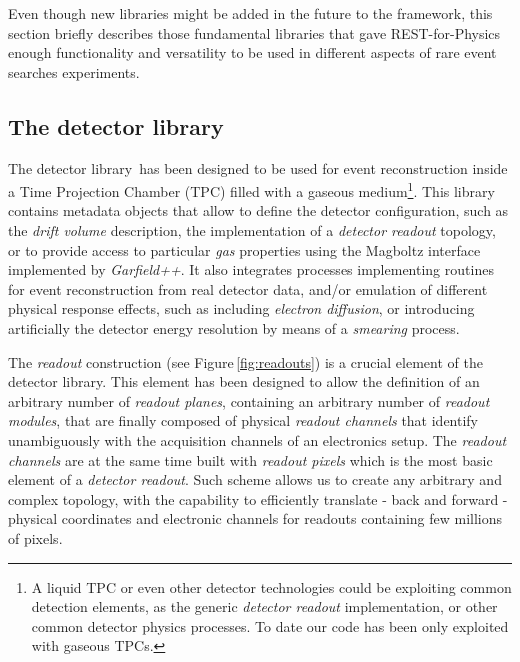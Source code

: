 Even though new libraries might be added in the future to the framework, this section briefly describes those fundamental libraries that gave REST-for-Physics enough functionality and versatility to be used in different aspects of rare event searches experiments.

\subsection{The detector library}

The detector library\,\cite{REST_Detector_Git} has been designed to be used for event reconstruction inside a Time Projection Chamber (TPC) filled with a gaseous medium\footnote{A liquid TPC or even other detector technologies could be exploiting common detection elements, as the generic \emph{detector readout} implementation, or other common detector physics processes. To date our code has been only exploited with gaseous TPCs.}. This library contains metadata objects that allow to define the detector configuration, such as the \emph{drift volume} description, the implementation of a \emph{detector readout} topology, or to provide access to particular \emph{gas} properties using the Magboltz interface implemented by \emph{Garfield++}. It also integrates processes implementing routines for event reconstruction from real detector data, and/or emulation of different physical response effects, such as including \emph{electron diffusion}, or introducing artificially the detector energy resolution by means of a \emph{smearing} process.

The \emph{readout} construction (see Figure\,\ref{fig:readouts}) is a crucial element of the detector library. This element has been designed to allow the definition of an arbitrary number of \emph{readout planes}, containing an arbitrary number of \emph{readout modules}, that are finally composed of physical \emph{readout channels} that identify unambiguously with the acquisition channels of an electronics setup. The \emph{readout channels} are at the same time built with \emph{readout pixels} which is the most basic element of a \emph{detector readout}. Such scheme allows us to create any arbitrary and complex topology, with the capability to efficiently translate - back and forward - physical coordinates and electronic channels for readouts containing few millions of pixels.

